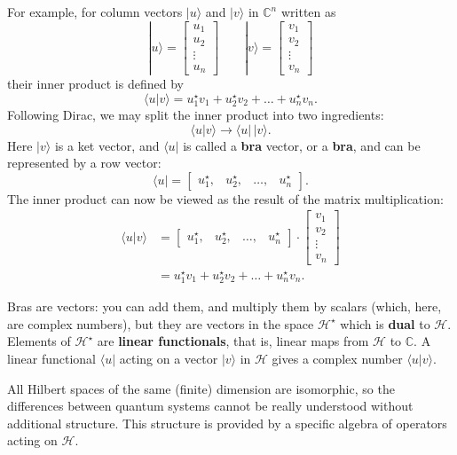 \documentclass[fleqn]{article}
\newenvironment{idea}{\noindent}{\medskip}
\begin{document}
For example, for column vectors \(|u\rangle\) and \(|v\rangle\) in \(\mathbb{C}^n\) written as
\[
  |u\rangle
  = \begin{bmatrix}u_1\\u_2\\\vdots\\u_n\end{bmatrix}
  \qquad
  |v\rangle
  = \begin{bmatrix}v_1\\v_2\\\vdots\\v_n\end{bmatrix}
\]
their inner product is defined by
\[
  \langle u|v\rangle
  = u_1^\star v_1 + u_2^\star v_2+\ldots + u_n^\star v_n.
\]
Following Dirac, we may split the inner product into two ingredients:
\[
  \langle u|v\rangle
  \longrightarrow \langle u|\,|v\rangle.
\]
Here \(|v\rangle\) is a ket vector, and \(\langle u|\) is called a \textbf{bra} vector, or a \textbf{bra}, and can be represented by a row vector:
\[
  \langle u|
  = \begin{bmatrix}u_1^\star,&u_2^\star,&\ldots,&u_n^\star\end{bmatrix}.
\]
The inner product can now be viewed as the result of the matrix multiplication:
\[
  \begin{aligned}
    \langle u|v\rangle
    &= \begin{bmatrix}u_1^\star,&u_2^\star,&\ldots,&u_n^\star\end{bmatrix}
    \cdot \begin{bmatrix}v_1\\v_2\\\vdots\\v_n\end{bmatrix}
  \\&= u_1^\star v_1 + u_2^\star v_2 + \ldots + u_n^\star v_n.
  \end{aligned}
\]

Bras are vectors: you can add them, and multiply them by scalars (which, here, are complex numbers), but they are vectors in the space \({\mathcal{H}}^\star\) which is \textbf{dual} to \(\mathcal{H}\).
Elements of \({\mathcal{H}}^\star\) are \textbf{linear functionals}, that is, linear maps from \(\mathcal{H}\) to \(\mathbb{C}\).
A linear functional \(\langle u|\) acting on a vector \(|v\rangle\) in \(\mathcal{H}\) gives a complex number \(\langle u|v\rangle\).

\begin{idea}
All Hilbert spaces of the same (finite) dimension are isomorphic, so the differences between quantum systems cannot be really understood without additional structure. This structure is provided by a specific algebra of operators acting on \(\mathcal{H}\).

\end{idea}
\end{document}
